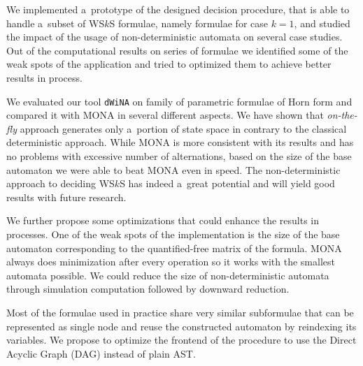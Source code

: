 We implemented a~prototype of the designed decision procedure, that is able to
handle a~subset of WS$k$S formulae, namely formulae for case $k = 1$, and
studied the impact of the usage of non-deterministic automata on several case
studies. Out of the computational results on series of formulae we identified
some of the weak spots of the application and tried to optimized them to achieve
better results in process.

We evaluated our tool \texttt{dWiNA} on family of parametric formulae of Horn
form and compared it with \textsc{MONA} in several different aspects. We have
shown that \emph{on-the-fly} approach generates only a~portion of state space in
contrary to the classical deterministic approach. While \textsc{MONA} is more
consistent with its results and has no problems with excessive number of
alternations, based on the size of the base automaton we were able to beat
\textsc{MONA} even in speed. The non-deterministic approach to deciding WS$k$S
has indeed a~great potential and will yield good results with future research.

We further propose some optimizations that could
enhance the results in processes. One of the weak spots of the implementation is
the size of the base automaton corresponding to the quantified-free matrix
of the formula.
\textsc{MONA} always does minimization after every operation so it works with
the smallest automata possible. We could reduce the size of non-deterministic
automata through simulation computation followed by downward reduction. 

Most of the formulae used in practice share very similar subformulae that can be
represented as single node and reuse the constructed automaton by reindexing its
variables. We propose to optimize the frontend of the procedure to use the
Direct Acyclic Graph (DAG) instead of plain AST. 

